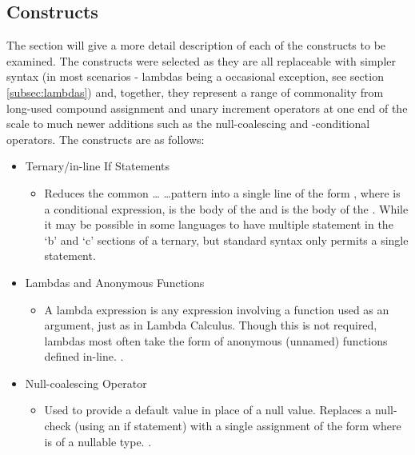 \documentclass{article}
\begin{document}
    \subsection{Constructs}
    \label{subsec:constructs}
    The section will give a more detail description of each of the constructs to be examined. The constructs were selected as they are all replaceable with simpler syntax (in most scenarios - lambdas being a occasional exception, see section \ref{subsec:lambdas}) and, together, they represent a range of commonality from long-used compound assignment and unary increment operators at one end of the scale to much newer additions such as the null-coalescing and -conditional operators. The constructs are as follows:
    \begin{itemize}
        \item Ternary/in-line If Statements
            \begin{itemize}
                \item Reduces the common  \dots {} \dots pattern into a single line of the form , where  is a conditional expression,  is the body of the  and  is the body of the . While it may be possible in some languages to have multiple statement in the `b' and `c' sections of a ternary, but standard syntax only permits a single statement.
            \end{itemize}
        \item Lambdas and Anonymous Functions
            \begin{itemize}
                \item A lambda expression is any expression involving a function used as an argument, just as in Lambda Calculus. Though this is not required, lambdas most often take the form of anonymous (unnamed) functions defined in-line. \citep{javaLambdas}.
            \end{itemize}
        \item Null-coalescing Operator
            \begin{itemize}
                \item Used to provide a default value in place of a null value. Replaces a null-check (using an if statement) with a single assignment of the form \newline{} where  is of a nullable type. \citep{cs5Spec}.
            \end{itemize}

\end{itemize}
\end{document}
